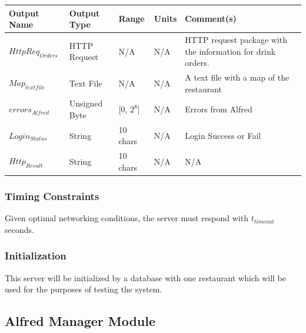\documentclass [10pt]{article}
\begin{document}
\begin{longtable}{| p{} | p{} | p{} | p{} | p{} |}\hline 
	\rowcolor{tableCell}\textbf{Output Name} & \textbf{Output Type} & \textbf{Range} & \textbf{Units} & \textbf{Comment(s)} \\ \hline
	$ HttpReq_{Orders} $ & HTTP Request & N/A & N/A & HTTP request package with the information for drink orders. \\ \hline
	\rowcolor{tableCell}$ Map_{textfile} $ & Text File & N/A & N/A & A text file with a map of the restaurant \\ \hline
	$  errors_{Alfred} $ & Unsigned Byte & [0, $2^{8}$]& N/A & Errors from Alfred \\ \hline
	\rowcolor{tableCell}$  Login_{Status} $ & String & 10 chars & N/A & Login Success or Fail \\ \hline
	$  Http_{Result} $ & String & 10 chars & N/A & N/A\\ \hline
\end{longtable}



\subsubsection{Timing Constraints}
Given optimal networking conditions, the server must respond with  $ t_{timeout} $ seconds.


\subsubsection{Initialization}
This server will be initialized by a database with one restaurant which will be used for the purposes of testing the system.


\subsection{Alfred Manager Module}

\end{document}
